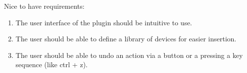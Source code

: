Nice to have requirements:
\begin{enumerate}
	\item The user interface of the plugin should be intuitive to use.
	\item The user should be able to define a library of devices for easier insertion.
	\item The user should be able to undo an action via a button or a pressing a key sequence (like ctrl + z).
\end{enumerate}
